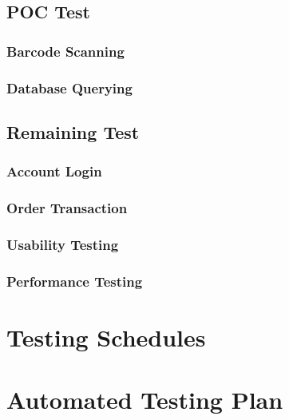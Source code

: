 \documentclass[12pt]{article}
\begin{document}
\subsection{POC Test}

\subsubsection{Barcode Scanning}

\subsubsection{Database Querying}

\subsection{Remaining Test}

\subsubsection{Account Login}

\subsubsection{Order Transaction}

\subsubsection{Usability Testing}

\subsubsection{Performance Testing}

\section{Testing Schedules}

\section{Automated Testing Plan}
\end{document}
